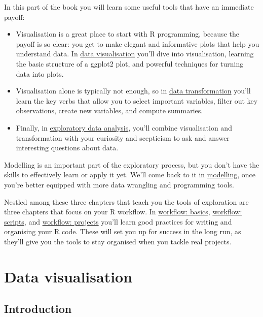 \documentclass[]{book}
\begin{document}
In this part of the book you will learn some useful tools that have an
immediate payoff:

\begin{itemize}
\item
  Visualisation is a great place to start with R programming, because
  the payoff is so clear: you get to make elegant and informative plots
  that help you understand data. In
  \protect\hyperlink{data-visualisation}{data visualisation} you'll dive
  into visualisation, learning the basic structure of a ggplot2 plot,
  and powerful techniques for turning data into plots.
\item
  Visualisation alone is typically not enough, so in
  \protect\hyperlink{transform}{data transformation} you'll learn the
  key verbs that allow you to select important variables, filter out key
  observations, create new variables, and compute summaries.
\item
  Finally, in \protect\hyperlink{exploratory-data-analysis}{exploratory
  data analysis}, you'll combine visualisation and transformation with
  your curiosity and scepticism to ask and answer interesting questions
  about data.
\end{itemize}

Modelling is an important part of the exploratory process, but you don't
have the skills to effectively learn or apply it yet. We'll come back to
it in \protect\hyperlink{model-intro}{modelling}, once you're better
equipped with more data wrangling and programming tools.

Nestled among these three chapters that teach you the tools of
exploration are three chapters that focus on your R workflow. In
\protect\hyperlink{workflow-basics}{workflow: basics},
\protect\hyperlink{workflow-scripts}{workflow: scripts}, and
\protect\hyperlink{workflow-projects}{workflow: projects} you'll learn
good practices for writing and organising your R code. These will set
you up for success in the long run, as they'll give you the tools to
stay organised when you tackle real projects.

\hypertarget{data-visualisation}{\chapter{Data
visualisation}\label{data-visualisation}}

\section{Introduction}\label{introduction-1}
\end{document}
